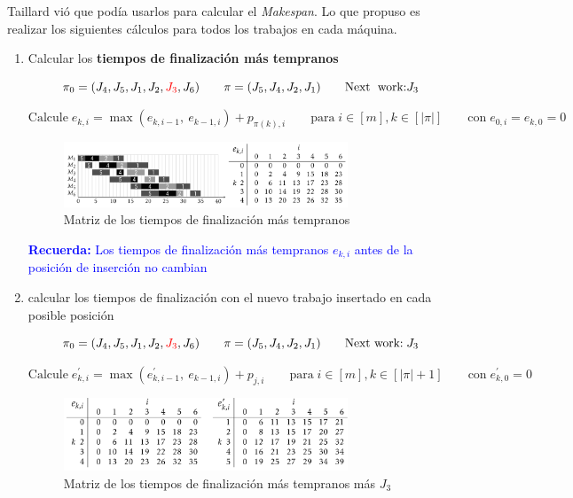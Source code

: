 \documentclass[10pt, a4paper]{article}
\begin{document}
Taillard vió que podía usarlos para calcular el \textit{Makespan}. Lo que propuso 
es realizar los siguientes cálculos para todos los trabajos en cada máquina.

\begin{enumerate}
  \item Calcular los \textbf{tiempos de finalización más tempranos}

    \[
      \pi_0 = (J_4, J_5, J_1, J_2, \textcolor{red}{J_3}, J_6) \qquad
      \pi = (J_5,J_4, J_2, J_1) \qquad  \text{Next\; work:} J_3 
    \]

    \[
      \text{Calcule}\; e_{k, i} =
      \max(e_{k, i-1},\ e_{k-1, i})+p_{\pi(k), i} \qquad
      \text{para}\; i \in [m], k \in [|\pi|] \qquad
      \text{con}\; e_{0, i} = e_{k, 0} = 0
    \]

    \begin{figure}[H]
      \centering
      \includegraphics[width=0.8\textwidth]{
        ./.github/1733417697.png
      }
      \caption{Matriz de los tiempos de finalización más 
      tempranos}\label{fig:Relative-earliest-completion-times's-matrice}
    \end{figure}

    \textcolor{blue}{\textbf{Recuerda:} Los tiempos de finalización más 
    tempranos $e_{k, i}$ antes de la posición de inserción no cambian}

  \item calcular los tiempos de finalización con el nuevo trabajo insertado
    en cada posible posición

    \[
      \pi_0 = (J_4, J_5, J_1, J_2, \textcolor{red}{J_3}, J_6) \qquad 
      \pi = (J_5,J_4, J_2, J_1) \qquad \text{Next work:}\; J_3 
    \]

    \[
      \text{Calcule}\; e^{'}_{k, i} = 
      \max(e^{'}_{k, i-1},\ e_{k-1, i}) + p_{j, i} \qquad 
      \text{para}\; i \in [m], k \in [|\pi| + 1] \qquad 
      \text{con}\; e^{'}_{k, 0} = 0
    \]

    \begin{figure}[H]
      \centering
      \includegraphics[width=0.8\textwidth]{
        ./.github/1733417714.png
      }
      \caption{Matriz de los tiempos de finalización más 
      tempranos más $J_3$}\label{
        fig:Relative-earliest-completion-times's-matrice-with-J3
      }
    \end{figure}


\end{enumerate}
\end{document}
